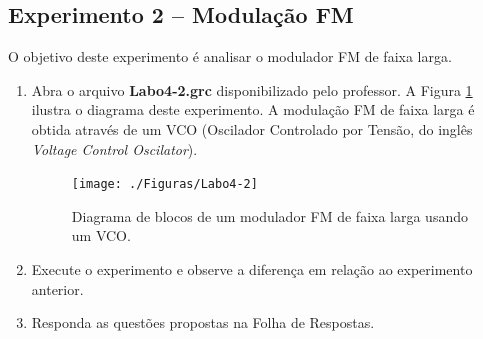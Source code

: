 \documentclass[12pt,addpoints]{exam}
\begin{document}


\subsection{Experimento 2 -- Modulação FM}

O objetivo deste experimento é analisar o modulador FM de faixa larga. 

\begin{enumerate}
    \item Abra o arquivo \textbf{Labo4-2.grc} disponibilizado pelo professor. A Figura \ref{fig:GRC_4-2} ilustra o diagrama deste experimento. A modulação FM de faixa larga é obtida através de um VCO (Oscilador Controlado por Tensão, do inglês {\it Voltage Control Oscilator}).
    \begin{figure}[htb]
        \centering
        \texttt{[image: ./Figuras/Labo4-2]}
        \caption{Diagrama de blocos de um modulador FM de faixa larga usando um VCO.}
        \label{fig:GRC_4-2}
    \end{figure}
  \item Execute o experimento e observe a diferença em relação ao experimento anterior.
  \item Responda as questões propostas na Folha de Respostas.
\end{enumerate}
\end{document}
